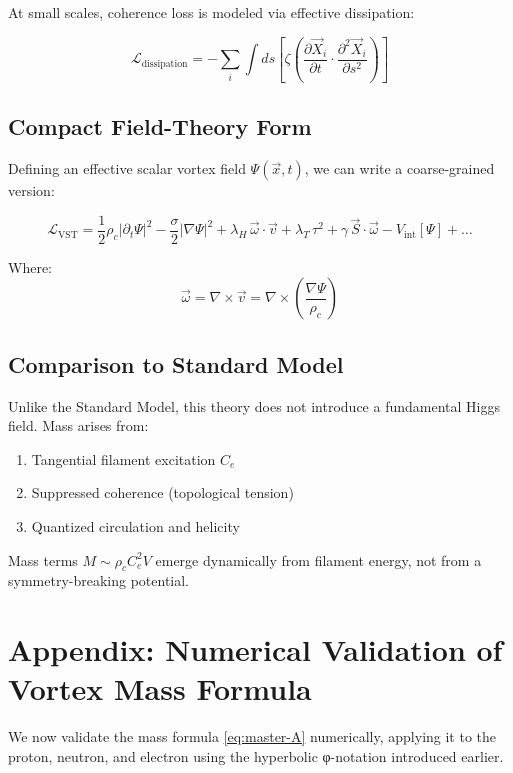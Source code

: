 \documentclass[11pt]{article}
\begin{document}
    At small scales, coherence loss is modeled via effective dissipation:

    \[
        \mathcal{L}_{\text{dissipation}} = -\sum_i \int ds \left[ \zeta \left( \frac{\partial \vec{X}_i}{\partial t} \cdot \frac{\partial^2 \vec{X}_i}{\partial s^2} \right) \right]
    \]

    \subsection{Compact Field-Theory Form}

    Defining an effective scalar vortex field \( \Psi(\vec{x}, t) \), we can write a coarse-grained version:

    \[
        \mathcal{L}_{\text{VST}} = \frac{1}{2} \rho_c \left| \partial_t \Psi \right|^2 - \frac{\sigma}{2} \left| \nabla \Psi \right|^2 + \lambda_H \, \vec{\omega} \cdot \vec{v} + \lambda_T \, \tau^2 + \gamma \, \vec{S} \cdot \vec{\omega} - V_{\text{int}}[\Psi] + \dots
    \]

    Where:
    \[
        \vec{\omega} = \nabla \times \vec{v} = \nabla \times \left( \frac{\nabla \Psi}{\rho_c} \right)
    \]

    \subsection{Comparison to Standard Model}

    Unlike the Standard Model, this theory does not introduce a fundamental Higgs field. Mass arises from:
    \begin{enumerate}
        \item Tangential filament excitation \( C_e \)
        \item Suppressed coherence (topological tension)
        \item Quantized circulation and helicity
    \end{enumerate}

    Mass terms \( M \sim \rho_c C_e^2 V \) emerge dynamically from filament energy, not from a symmetry-breaking potential.


    \appendix
    \section*{Appendix: Numerical Validation of Vortex Mass Formula}
    We now validate the mass formula \eqref{eq:master-A} numerically, applying it to the proton, neutron, and electron using the hyperbolic φ-notation introduced earlier.
\end{document}
